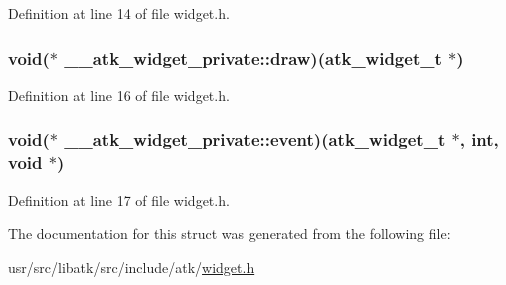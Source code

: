 Definition at line 14 of file widget.\+h.

\hypertarget{struct____atk__widget__private_ae3e2eae5b840dd43fd3f458d077a8fe9}{
\subsubsection[{draw}]{\setlength{\rightskip}{0pt plus 5cm}void($\ast$ \+\_\+\+\_\+atk\+\_\+widget\+\_\+private\+::draw)({\bf atk\+\_\+widget\+\_\+t} $\ast$)}}\label{struct____atk__widget__private_ae3e2eae5b840dd43fd3f458d077a8fe9}


Definition at line 16 of file widget.\+h.

\hypertarget{struct____atk__widget__private_a46674987ae41a9d4e1b33b9e2d9424bc}{
\subsubsection[{event}]{\setlength{\rightskip}{0pt plus 5cm}void($\ast$ \+\_\+\+\_\+atk\+\_\+widget\+\_\+private\+::event)({\bf atk\+\_\+widget\+\_\+t} $\ast$, int, void $\ast$)}}\label{struct____atk__widget__private_a46674987ae41a9d4e1b33b9e2d9424bc}


Definition at line 17 of file widget.\+h.



The documentation for this struct was generated from the following file\+:\begin{DoxyCompactItemize}
\item 
usr/src/libatk/src/include/atk/\hyperlink{widget_8h}{widget.\+h}\end{DoxyCompactItemize}
